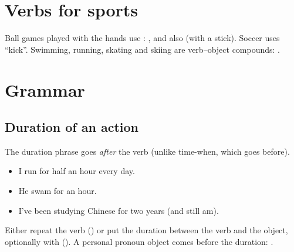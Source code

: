 \section{Verbs for sports}

\begin{important}
Ball games played with the hands use : ,
and also  (with a stick). Soccer uses  ``kick''. Swimming, running,
skating and skiing are verb--object compounds: .
\end{important}

\section{Grammar}

\subsection{Duration of an action}

The duration phrase goes \emph{after} the verb (unlike time-when, which goes before).
\begin{itemize}
  \item {} I run for half an hour every day.
  \item {} He swam for an hour.
  \item {} I've been studying Chinese for two years (and still am).
\end{itemize}

\begin{important}
Either repeat the verb () or put the duration between the verb and
the object, optionally with  (). A personal pronoun object
comes before the duration: .
\end{important}

\begin{center}
\end{center}

